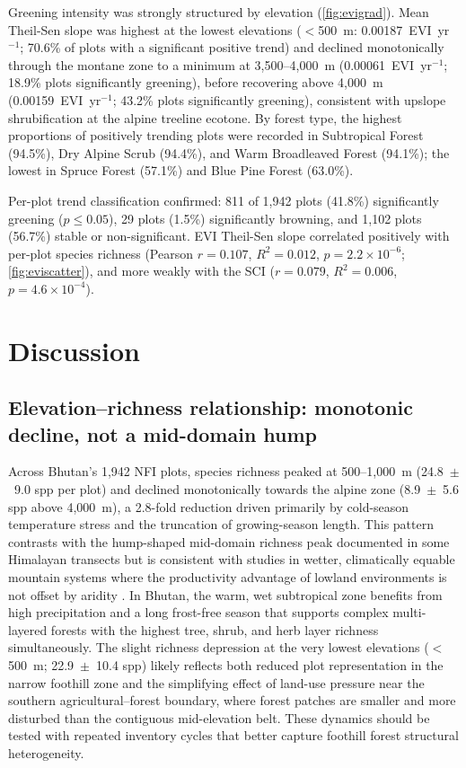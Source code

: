 \documentclass[review,12pt,a4paper]{elsarticle}
\begin{document}
Greening intensity was strongly structured by elevation (\cref{fig:evigrad}).
Mean Theil-Sen slope was highest at the lowest elevations
($<$500~m: 0.00187~EVI~yr$^{-1}$; 70.6\% of plots with a significant positive
trend) and declined monotonically through the montane zone to a minimum at
3{,}500--4{,}000~m (0.00061~EVI~yr$^{-1}$; 18.9\% plots significantly
greening), before recovering above 4{,}000~m
(0.00159~EVI~yr$^{-1}$; 43.2\% plots significantly greening), consistent with
upslope shrubification at the alpine treeline ecotone. By forest type,
the highest proportions of positively trending plots were recorded in
Subtropical Forest (94.5\%), Dry Alpine Scrub (94.4\%), and Warm Broadleaved
Forest (94.1\%); the lowest in Spruce Forest (57.1\%) and Blue Pine Forest
(63.0\%).

Per-plot trend classification confirmed: 811 of 1{,}942 plots (41.8\%)
significantly greening ($p \leq 0.05$), 29 plots (1.5\%) significantly
browning, and 1{,}102 plots (56.7\%) stable or non-significant.
EVI Theil-Sen slope correlated positively with per-plot species richness
(Pearson $r = 0.107$, $R^2 = 0.012$, $p = 2.2 \times 10^{-6}$;
\cref{fig:eviscatter}), and more weakly with the SCI
($r = 0.079$, $R^2 = 0.006$, $p = 4.6 \times 10^{-4}$).

\section{Discussion}
\label{sec:discussion}

\subsection{Elevation--richness relationship: monotonic decline, not a mid-domain hump}
\label{sec:disc_richness}

Across Bhutan's 1{,}942 NFI plots, species richness peaked at 500--1{,}000~m
(24.8~$\pm$~9.0 spp per plot) and declined monotonically towards the alpine
zone (8.9~$\pm$~5.6 spp above 4{,}000~m), a 2.8-fold reduction driven
primarily by cold-season temperature stress and the truncation of growing-season
length. This pattern contrasts with the hump-shaped mid-domain richness peak
documented in some Himalayan transects \citep{grytnes2002} but is consistent
with studies in wetter, climatically equable mountain systems where the
productivity advantage of lowland environments is not offset by aridity
\citep{rahbek1995}. In Bhutan, the warm, wet subtropical zone benefits from
high precipitation and a long frost-free season that supports complex
multi-layered forests with the highest tree, shrub, and herb layer richness
simultaneously. The slight richness depression at the very lowest elevations
($<$500~m; 22.9~$\pm$~10.4 spp) likely reflects both reduced plot
representation in the narrow foothill zone and the simplifying effect of
land-use pressure near the southern agricultural--forest boundary, where
forest patches are smaller and more disturbed than the contiguous mid-elevation
belt. These dynamics should be tested with repeated inventory cycles that
better capture foothill forest structural heterogeneity.
\end{document}
